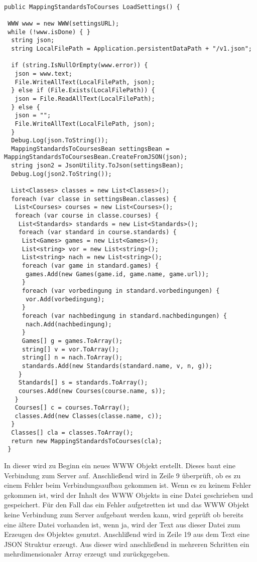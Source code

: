 \begin{scriptsize}
\lstset{
	float,
	caption=Methode LoadSettings, 
	language=[Sharp]C, 
	frame=single,  
	showstringspaces=false, 
	showspaces=false, 
	numbers=left, 
	captionpos=b, 
	belowcaptionskip=4pt,
	basicstyle=\ttfamily
} 
\begin{lstlisting}[label=lst:methode3]

public MappingStandardsToCourses LoadSettings() {

 WWW www = new WWW(settingsURL);
 while (!www.isDone) { }
  string json;
  string LocalFilePath = Application.persistentDataPath + "/v1.json";

  if (string.IsNullOrEmpty(www.error)) {
   json = www.text;
   File.WriteAllText(LocalFilePath, json);
  } else if (File.Exists(LocalFilePath)) {
   json = File.ReadAllText(LocalFilePath);
  } else {
   json = "";                
   File.WriteAllText(LocalFilePath, json);
  }
  Debug.Log(json.ToString());
  MappingStandardsToCoursesBean settingsBean = MappingStandardsToCoursesBean.CreateFromJSON(json);
  string json2 = JsonUtility.ToJson(settingsBean);
  Debug.Log(json2.ToString());

  List<Classes> classes = new List<Classes>();
  foreach (var classe in settingsBean.classes) {
   List<Courses> courses = new List<Courses>();
   foreach (var course in classe.courses) {
    List<Standards> standards = new List<Standards>();
    foreach (var standard in course.standards) {
     List<Games> games = new List<Games>();
     List<string> vor = new List<string>();
     List<string> nach = new List<string>();
     foreach (var game in standard.games) {
      games.Add(new Games(game.id, game.name, game.url));
     }
     foreach (var vorbedingung in standard.vorbedingungen) {
      vor.Add(vorbedingung);
     }
     foreach (var nachbedingung in standard.nachbedingungen) {
      nach.Add(nachbedingung);
     }
     Games[] g = games.ToArray();
     string[] v = vor.ToArray();
     string[] n = nach.ToArray();
     standards.Add(new Standards(standard.name, v, n, g));
    }
    Standards[] s = standards.ToArray();
    courses.Add(new Courses(course.name, s));
   }
   Courses[] c = courses.ToArray();
   classes.Add(new Classes(classe.name, c));
  }
  Classes[] cla = classes.ToArray();
  return new MappingStandardsToCourses(cla);
 }
\end{lstlisting}
\end{scriptsize}

			In dieser wird zu Beginn ein neues WWW Objekt erstellt. Dieses baut eine Verbindung zum Server auf. Anschließend wird in Zeile 9 überprüft, ob es zu einem Fehler beim Verbindungsaufbau gekommen ist. Wenn es zu keinem Fehler gekommen ist, wird der Inhalt des WWW Objekts in eine Datei geschrieben und gespeichert. Für den Fall das ein Fehler aufgetretten ist und das WWW Objekt keine Verbindung zum Server aufgebaut werden kann, wird geprüft ob bereits eine ältere Datei vorhanden ist, wenn ja, wird der Text aus dieser Datei zum Erzeugen des Objektes genutzt. Anschlißend wird in Zeile 19 aus dem Text eine JSON Struktur erzeugt. Aus dieser wird anschließend in mehreren Schritten ein mehrdimensionaler Array erzeugt und zurückgegeben.

